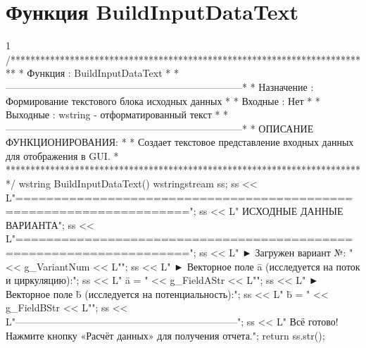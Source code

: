 \section{Функция BuildInputDataText}
\footnotesize
\begin{listing}{1}
/*************************************************************************
* Функция       : BuildInputDataText                                     *
*------------------------------------------------------------------------*
* Назначение    : Формирование текстового блока исходных данных          *
* Входные       : Нет                                                    *
* Выходные      : wstring - отформатированный текст                      *
*------------------------------------------------------------------------*
* ОПИСАНИЕ ФУНКЦИОНИРОВАНИЯ:                                             *
* Создает текстовое представление входных данных для отображения в GUI.  *
*************************************************************************/
wstring BuildInputDataText() {
    wstringstream ss;
    ss << L"====================================================================\n";
    ss << L"        ИСХОДНЫЕ ДАННЫЕ ВАРИАНТА\n";
    ss << L"====================================================================\n\n";
    ss << L"  ► Загружен вариант №:  " << g_VariantNum << L"\n\n";
    ss << L"  ► Векторное поле ā (исследуется на поток и циркуляцию):\n";
    ss << L"    ā = " << g_FieldAStr << L"\n\n";
    ss << L"  ► Векторное поле b̄ (исследуется на потенциальность):\n";
    ss << L"    b̄ = " << g_FieldBStr << L"\n\n";
    ss << L"--------------------------------------------------------------------\n";
    ss << L"  Всё готово! Нажмите кнопку «Расчёт данных» для получения отчета.";
    return ss.str();
}
\end{listing}
\normalsize

\pagebreak